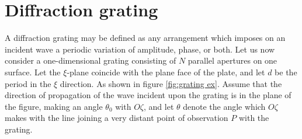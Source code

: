 \documentclass[12pt,twoside,english]{book}
\renewcommand{\~}{\perispomeni}%
\numberwithin{equation}{section}
\numberwithin{figure}{section}
\begin{document}
\section{Diffraction grating}
\label{section:Diffraction-grating}
A diffraction grating may be defined as any arrangement which imposes on an incident wave a periodic variation of amplitude, phase, or both.
Let us now consider a one-dimensional grating consisting of $N$ parallel apertures on one surface. Let the $\xi$-plane coincide with the plane face of the plate, and let $d$ be the period in the $\xi$ direction. As shown in figure \ref{fig:grating ex}. Assume that the direction of propagation of the wave incident upon the grating is in the plane of the figure, making an angle $\theta_{0}$ with $O\zeta$, and let $\theta$ denote the angle which $O\zeta$ makes with the line joining a very distant point of observation $P$ with the grating.
\end{document}
